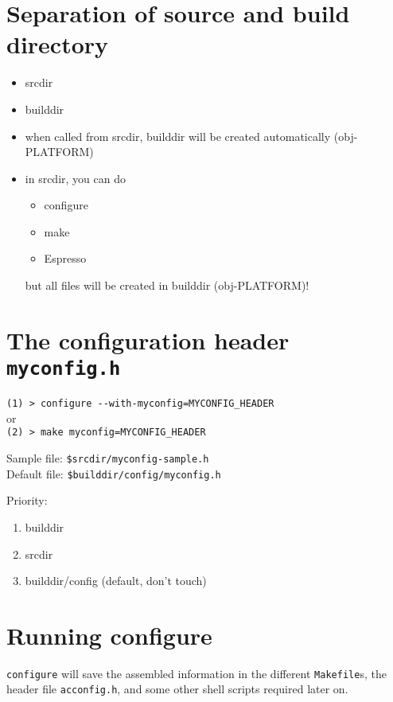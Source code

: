 \section{Separation of source and build directory}
\label{sec:builddir}

\begin{itemize}
\item srcdir
\item builddir
\item when called from srcdir, builddir will be
  created automatically (obj-PLATFORM)
\item in srcdir, you can do 
  \begin{itemize}
  \item configure
  \item make
  \item Espresso 
  \end{itemize}
  but all files will be created in builddir (obj-PLATFORM)!
\end{itemize}

\section{The configuration header \texttt{myconfig.h}}
\label{sec:myconfig}

\verb!(1) > configure --with-myconfig=MYCONFIG_HEADER!\\
or\\
\verb!(2) > make myconfig=MYCONFIG_HEADER!

\noindent 
Sample file: \verb!$srcdir/myconfig-sample.h! \\
Default file: \verb!$builddir/config/myconfig.h!

Priority: 
\begin{enumerate}
\item builddir
\item srcdir
\item builddir/config (default, don't touch)
\end{enumerate}

\section{Running configure}
\label{sec:configure}

\texttt{configure} will save the assembled information in the
different \texttt{Makefile}s, the header file \texttt{acconfig.h}, and
some other shell scripts required later on.

